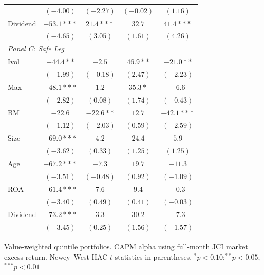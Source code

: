 \begin{tabular}{l c c c c}
 & $(-4.00)$ & $(-2.27)$ & $(-0.02)$ & $(1.16)$ \\
Dividend & $-53.1***$ & $21.4***$ & $32.7$ & $41.4***$ \\
 & $(-4.65)$ & $(3.05)$ & $(1.61)$ & $(4.26)$ \\
\midrule
\multicolumn{5}{l}{\textit{Panel C: Safe Leg}} \\
Ivol & $-44.4**$ & $-2.5$ & $46.9**$ & $-21.0**$ \\
 & $(-1.99)$ & $(-0.18)$ & $(2.47)$ & $(-2.23)$ \\
Max & $-48.1***$ & $1.2$ & $35.3*$ & $-6.6$ \\
 & $(-2.82)$ & $(0.08)$ & $(1.74)$ & $(-0.43)$ \\
BM & $-22.6$ & $-22.6**$ & $12.7$ & $-42.1***$ \\
 & $(-1.12)$ & $(-2.03)$ & $(0.59)$ & $(-2.59)$ \\
Size & $-69.0***$ & $4.2$ & $24.4$ & $5.9$ \\
 & $(-3.62)$ & $(0.33)$ & $(1.25)$ & $(1.25)$ \\
Age & $-67.2***$ & $-7.3$ & $19.7$ & $-11.3$ \\
 & $(-3.51)$ & $(-0.48)$ & $(0.92)$ & $(-1.09)$ \\
ROA & $-61.4***$ & $7.6$ & $9.4$ & $-0.3$ \\
 & $(-3.40)$ & $(0.49)$ & $(0.41)$ & $(-0.03)$ \\
Dividend & $-73.2***$ & $3.3$ & $30.2$ & $-7.3$ \\
 & $(-3.45)$ & $(0.25)$ & $(1.56)$ & $(-1.57)$ \\
\bottomrule
\end{tabular}
\vspace{4pt}
\begin{minipage}{0.9\textwidth}
\footnotesize
Value-weighted quintile portfolios. CAPM alpha using full-month JCI market excess return.
Newey--West HAC $t$-statistics in parentheses.
$^{*}p<0.10$;\quad $^{**}p<0.05$;\quad $^{***}p<0.01$
\end{minipage}
